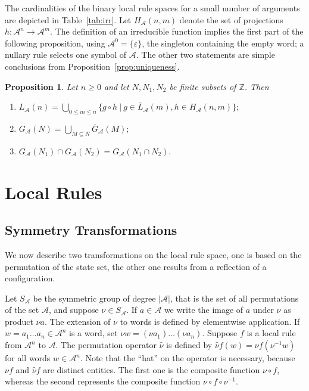 \documentclass[11pt,a4paper]{article}
\newcommand{\rev}[1]{{\color{blue}#1}}
\newcommand{\rev}[1]{{\color{black}#1}}
\newtheorem{prop}{Proposition}
\begin{document}
The cardinalities of the binary local rule spaces for a small number of arguments are
depicted in Table~\ref{tab:irr}.
Let $H_\mathcal{A}(n, m)$ denote the set of projections $h : \mathcal{A}^n \to \mathcal{A}^m$.
The definition of an irreducible function implies the first part of the following proposition,
\rev{using $\mathcal A^0=\{\varepsilon\}$, the singleton containing the empty word; a nullary rule selects one symbol of $\mathcal A$.}
The other two statements are simple conclusions from Proposition~\ref{prop:uniqueness}.
\begin{prop}
\label{prop:props}
\rev{Let $n\geq0$ and let $N,N_1,N_2$ be finite subsets of $\mathbb Z$.}
Then
\begin{enumerate}[label=(\roman*)]
\item
$
L_\mathcal{A}(n) = \bigcup_{0 \le m \le n} \{ g \circ h \ | \ g \in \overline{L}_\mathcal{A}(m), h \in H_\mathcal{A}(n,m) \};
$
\item
$
G_\mathcal{A}(N) = \bigcup_{M\subseteq N} \overline{G}_\mathcal{A}(M);
$
\item
$
G_\mathcal{A}(N_1) \cap G_\mathcal{A}(N_2) = G_\mathcal{A}(N_1 \cap N_2).
$
\end{enumerate}
\end{prop}
\section{Local Rules}
\label{sec:loc}

\subsection{Symmetry Transformations}
\label{sec:loc-symm}

We now describe two transformations on the local rule space, one is based
on the permutation of the state set, the other one results from a reflection of a configuration.

Let $S_\mathcal{A}$ be the symmetric group of degree $|\mathcal{A}|$,
that is the set of all permutations of the set $\mathcal{A}$,
and suppose $\nu \in S_\mathcal{A}$.
If $a \in \mathcal{A}$ we write the image of $a$ under $\nu$ as product $\nu a$.
The extension of $\nu$ to words is defined by elementwise application.
If $w = a_1\ldots a_{n} \in \mathcal{A}^n$ is a word,
set $\nu w  = (\nu a_1) \ldots (\nu a_{n})$.
Suppose $f$ is a local rule from $\mathcal{A}^n$ to $\mathcal{A}$.
The permutation operator $\hat{\nu}$ is
defined by
$\hat{\nu}f(w) = \nu f ( \nu^{-1} w)$ for all words $w \in \mathcal{A}^n$.
Note that the  ``hat'' on the operator is necessary, because $\nu f$ and
$\hat{\nu} f$ are distinct entities.
The first one is the composite function $\nu \circ f$, whereas the second represents
the composite function $\nu \circ f \circ \nu^{-1}$.
\end{document}
